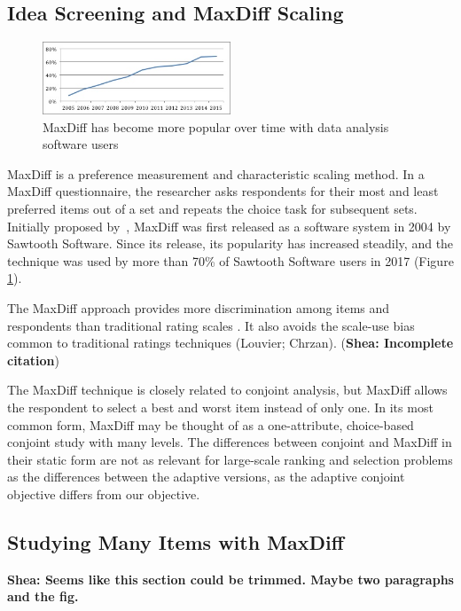 \documentclass[a4paper,11pt]{article}
\begin{document}
\subsection{Idea Screening and MaxDiff Scaling}
\begin{figure}
\caption{MaxDiff has become more popular over time with data analysis software users} \label{fig:pop}
\begin{center}
\includegraphics[width=0.5\textwidth]{plots/maxdiffpop}
\end{center}
\end{figure}
MaxDiff is a preference measurement and characteristic scaling method. In a MaxDiff questionnaire, the researcher asks respondents for their most and least preferred items out of a set and repeats the choice task for subsequent sets. Initially proposed by~\cite{louviere1991best}, MaxDiff was first released as a software system in 2004 by Sawtooth Software. Since its release, its popularity has increased steadily, and the technique was used by more than 70\% of Sawtooth Software users in 2017 (Figure \ref{fig:pop}). 

The MaxDiff approach provides more discrimination among items and respondents than traditional rating scales \citep{cohen2004s}. It also avoids the scale-use bias common to traditional ratings techniques (Louvier; Chrzan). (\textbf{Shea: Incomplete citation})

The MaxDiff technique is closely related to conjoint analysis, but MaxDiff allows the respondent to select a best and worst item instead of only one. In its most common form, MaxDiff may be thought of as a one-attribute, choice-based conjoint study with many levels. The differences between conjoint and MaxDiff in their static form are not as relevant for large-scale ranking and selection problems as the differences between the adaptive versions, as the adaptive conjoint objective differs from our objective.

\subsection{Studying Many Items with MaxDiff}
\textbf{Shea: Seems like this section could be trimmed. Maybe two paragraphs and the fig.} 
\end{document}
